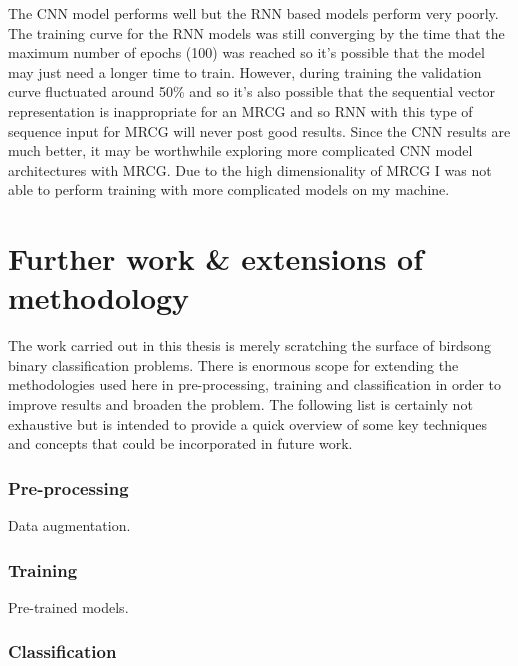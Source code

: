 The CNN model performs well but the RNN based models perform very poorly. The
training curve for the RNN models was still converging by the time that the
maximum number of epochs (100) was reached so it's possible that the model may
just need a longer time to train. However, during training the validation curve
fluctuated around 50\% and so it's also possible that the sequential vector
representation is inappropriate for an MRCG and so RNN with this type of
sequence input for MRCG will never post good results. Since the CNN results are
much better, it may be worthwhile exploring more complicated CNN model
architectures with MRCG\@. Due to the high dimensionality of MRCG I was not able
to perform training with more complicated models on my machine.

\section{Further work \& extensions of methodology}

The work carried out in this thesis is merely scratching the surface of birdsong
binary classification problems. There is enormous scope for extending the
methodologies used here in pre-processing, training and classification in order
to improve results and broaden the problem. The following list is certainly not
exhaustive but is intended to provide a quick overview of some key techniques
and concepts that could be incorporated in future work.

\subsubsection{Pre-processing}

Data augmentation.

\subsubsection{Training}

Pre-trained models.

\subsubsection{Classification}

